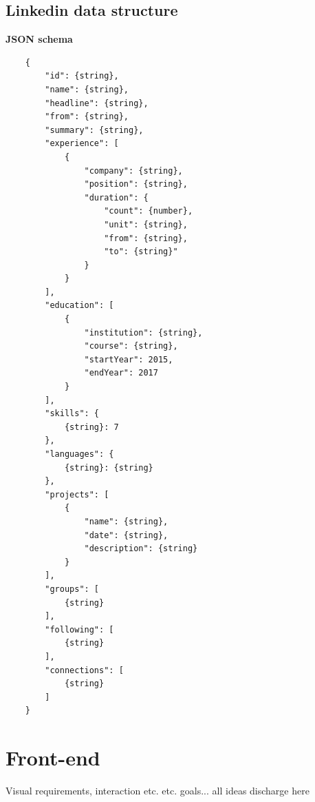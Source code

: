 \subsection*{Linkedin data structure}
\textbf{JSON schema}
\begin{verbatim}
    {
        "id": {string},
        "name": {string},
        "headline": {string},
        "from": {string},
        "summary": {string},
        "experience": [
            {
                "company": {string},
                "position": {string},
                "duration": {
                    "count": {number},
                    "unit": {string},
                    "from": {string},
                    "to": {string}"
                }
            }
        ],
        "education": [
            {
                "institution": {string},
                "course": {string},
                "startYear": 2015,
                "endYear": 2017
            }
        ],
        "skills": {
            {string}: 7
        },
        "languages": {
            {string}: {string}
        },
        "projects": [
            {
                "name": {string},
                "date": {string},
                "description": {string}
            }
        ],
        "groups": [
            {string}
        ],
        "following": [
            {string}
        ],
        "connections": [
            {string}
        ]
    }
\end{verbatim}



\section{Front-end}
Visual requirements, interaction etc. etc.
goals...
all ideas discharge here
